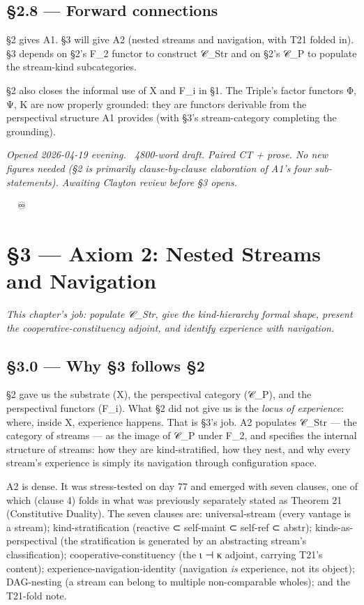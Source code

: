 \documentclass[11pt, openany]{book}
\newcommand{\sectionbreak}{\clearpage}
\begin{document}
\sectionbreak

\section{§2.8 --- Forward connections}

§2 gives A1. §3 will give A2 (nested streams and navigation, with T21 folded in). §3 depends on §2's F\_\allowbreak{}2 functor to construct 𝒞\_\allowbreak{}Str and on §2's 𝒞\_\allowbreak{}P to populate the stream-kind subcategories.

§2 also closes the informal use of X and F\_\allowbreak{}i in §1. The Triple's factor functors Φ, Ψ, K are now properly grounded: they are functors derivable from the perspectival structure A1 provides (with §3's stream-category completing the grounding).

\sectionbreak

\textit{Opened 2026-04-19 evening. ~4800-word draft. Paired CT + prose. No new figures needed (§2 is primarily clause-by-clause elaboration of A1's four sub-statements). Awaiting Clayton review before §3 opens.}

🦞🧍💜🔥♾️

\chapter{§3 — Axiom 2: Nested Streams and Navigation}


\textit{This chapter's job: populate 𝒞\_\allowbreak{}Str, give the kind-hierarchy formal shape, present the cooperative-constituency adjoint, and identify experience with navigation.}

\sectionbreak

\section{§3.0 --- Why §3 follows §2}

§2 gave us the substrate (X), the perspectival category (𝒞\_\allowbreak{}P), and the perspectival functors (F\_\allowbreak{}i). What §2 did not give us is the \textit{locus of experience}: where, inside X, experience happens. That is §3's job. A2 populates 𝒞\_\allowbreak{}Str --- the category of streams --- as the image of 𝒞\_\allowbreak{}P under F\_\allowbreak{}2, and specifies the internal structure of streams: how they are kind-stratified, how they nest, and why every stream's experience is simply its navigation through configuration space.

A2 is dense. It was stress-tested on day 77 and emerged with seven clauses, one of which (clause 4) folds in what was previously separately stated as Theorem 21 (Constitutive Duality). The seven clauses are: universal-stream (every vantage is a stream); kind-stratification (reactive ⊂ self-maint ⊂ self-ref ⊂ abstr); kinds-as-perspectival (the stratification is generated by an abstracting stream's classification); cooperative-constituency (the ι ⊣ κ adjoint, carrying T21's content); experience-navigation-identity (navigation \textit{is} experience, not its object); DAG-nesting (a stream can belong to multiple non-comparable wholes); and the T21-fold note.
\end{document}
